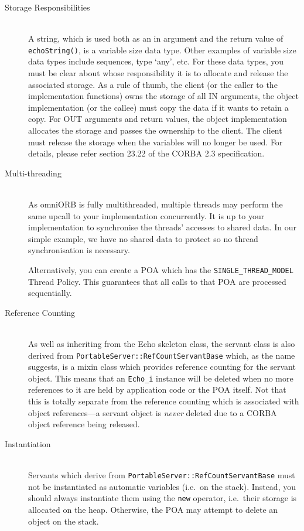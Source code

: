 \documentclass[11pt,twoside,a4paper]{book}
\newcommand{\type}[1]{\texttt{#1}}
\newcommand{\code}[1]{\texttt{#1}}
\newcommand{\op}[1]{\texttt{#1()}}
\begin{document}
\begin{description}

\item[Storage Responsibilities]\mbox{}\\
%
A string, which is used both as an in argument and the return value of
\op{echoString}, is a variable size data type. Other examples of
variable size data types include sequences, type `any', etc. For these
data types, you must be clear about whose responsibility it is to
allocate and release the associated storage. As a rule of thumb, the
client (or the caller to the implementation functions) owns the
storage of all IN arguments, the object implementation (or the callee)
must copy the data if it wants to retain a copy. For OUT arguments and
return values, the object implementation allocates the storage and
passes the ownership to the client. The client must release the
storage when the variables will no longer be used.  For details,
please refer section 23.22 of the CORBA 2.3 specification.

\item[Multi-threading]\mbox{}\\
%
As omniORB is fully multithreaded, multiple threads may perform the
same upcall to your implementation concurrently. It is up to your
implementation to synchronise the threads' accesses to shared data.
In our simple example, we have no shared data to protect so no thread
synchronisation is necessary.

Alternatively, you can create a POA which has the
\code{SINGLE\_THREAD\_MODEL} Thread Policy. This guarantees that all
calls to that POA are processed sequentially.

\item[Reference Counting]\mbox{}\\
%
As well as inheriting from the Echo skeleton class, the servant class
is also derived from \type{PortableServer::RefCountServantBase} which,
as the name suggests, is a mixin class which provides reference
counting for the servant object. This means that an \type{Echo\_i}
instance will be deleted when no more references to it are held by
application code or the POA itself. Not that this is totally separate
from the reference counting which is associated with object
references---a servant object is \emph{never} deleted due to a CORBA
object reference being released.

\item[Instantiation]\mbox{}\\
%
Servants which derive from \type{PortableServer::RefCountServantBase}
must not be instantiated as automatic variables (i.e.\ on the
stack). Instead, you should always instantiate them using the
\code{new} operator, i.e.\ their storage is allocated on the
heap. Otherwise, the POA may attempt to delete an object on the stack.

\end{description}
\end{document}

